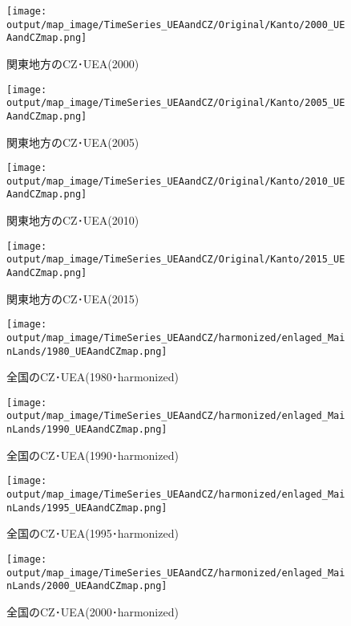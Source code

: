 \documentclass{ltjsarticle}
\begin{document}
\begin{figure}[pbth]
  \centering
  \texttt{[image: output/map\_image/TimeSeries\_UEAandCZ/Original/Kanto/2000\_UEAandCZmap.png]}
  \caption{\label{ori:tsK2000}関東地方のCZ･UEA(2000)}
\end{figure}

\begin{figure}[pbth]
  \centering
  \texttt{[image: output/map\_image/TimeSeries\_UEAandCZ/Original/Kanto/2005\_UEAandCZmap.png]}
  \caption{\label{ori:tsK2005}関東地方のCZ･UEA(2005)}
\end{figure}

\begin{figure}[pbth]
  \centering
  \texttt{[image: output/map\_image/TimeSeries\_UEAandCZ/Original/Kanto/2010\_UEAandCZmap.png]}
  \caption{\label{ori:tsK2010}関東地方のCZ･UEA(2010)}
\end{figure}

\begin{figure}[pbth]
  \centering
  \texttt{[image: output/map\_image/TimeSeries\_UEAandCZ/Original/Kanto/2015\_UEAandCZmap.png]}
  \caption{\label{ori:tsK2015}関東地方のCZ･UEA(2015)}
\end{figure}

  \begin{figure}[pbth]
    \centering
    \texttt{[image: output/map\_image/TimeSeries\_UEAandCZ/harmonized/enlaged\_MainLands/1980\_UEAandCZmap.png]}
    \caption{\label{ham:tsM1980}全国のCZ･UEA(1980･harmonized)}
  \end{figure}
  
  \begin{figure}[pbth]
    \centering
    \texttt{[image: output/map\_image/TimeSeries\_UEAandCZ/harmonized/enlaged\_MainLands/1990\_UEAandCZmap.png]}
    \caption{\label{ham:tsM1990}全国のCZ･UEA(1990･harmonized)}
  \end{figure}
  
  \begin{figure}[pbth]
    \centering
    \texttt{[image: output/map\_image/TimeSeries\_UEAandCZ/harmonized/enlaged\_MainLands/1995\_UEAandCZmap.png]}
    \caption{\label{ham:tsM1995}全国のCZ･UEA(1995･harmonized)}
  \end{figure}
  
  \begin{figure}[pbth]
    \centering
    \texttt{[image: output/map\_image/TimeSeries\_UEAandCZ/harmonized/enlaged\_MainLands/2000\_UEAandCZmap.png]}
    \caption{\label{ham:tsM2000}全国のCZ･UEA(2000･harmonized)}
  \end{figure}
  
\end{document}
